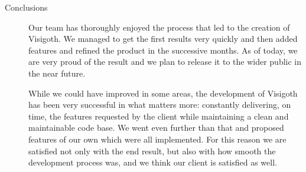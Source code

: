 \documentclass[a4paper,11pt,titlepage]{article}
\begin{document}
\begin{description}
	\item[Conclusions]

    Our team has thoroughly enjoyed the process that led to the creation of
    Visigoth. We managed to get the first results very quickly and then added
    features and refined the product in the successive months. As of today, we
    are very proud of the result and we plan to release it to the wider public
    in the near future.

    While we could have improved in some areas, the development of Visigoth has
    been very successful in what matters more: constantly delivering, on time,
    the features requested by the client while maintaining a clean and
    maintainable code base. We went even further than that and proposed features
    of our own which were all implemented. For this reason we are satisfied not
    only with the end result, but also with how smooth the development process
    was, and we think our client is satisfied as well.

\end{description}
\end{document}
